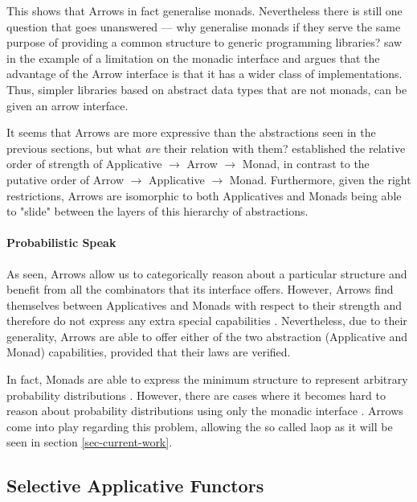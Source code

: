 \documentclass[
  oneside,
  11pt, a4paper,
  footinclude=true,
  headinclude=true,
  cleardoublepage=empty
]{scrbook}
\theoremstyle{definition}
\theoremstyle{definition}
\begin{document}
    This shows that Arrows in fact generalise monads. Nevertheless there is still one question that goes unanswered --- why generalise monads if they serve the same purpose of providing a common structure to generic programming libraries? \cite{Hughes:2000:GMA:347238.347246} saw in the example of \cite{swiestra&duponcheel} a limitation on the monadic interface and argues that the advantage of the Arrow interface is that it has a wider class of implementations. Thus, simpler libraries based on abstract data types that are not monads, can be given an arrow interface.
                
    It seems that Arrows are more expressive than the abstractions seen in the previous sections, but what \emph{are} their relation with them? \cite{Lindley:2011:IOA:1953652.1954016} established the relative order of strength of Applicative $\rightarrow$ Arrow $\rightarrow$ Monad, in contrast to the putative order of Arrow $\rightarrow$ Applicative $\rightarrow$ Monad. Furthermore, given the right restrictions, Arrows are isomorphic to both Applicatives and Monads being able to "slide" between the layers of this hierarchy of abstractions.
    	        
    	        \paragraph{Probabilistic Speak}
    	        
    As seen, Arrows allow us to categorically reason about a particular structure and benefit from all the combinators that its interface offers. However, Arrows find themselves between Applicatives and Monads with respect to their strength and therefore do not express any extra special capabilities \citep{Lindley:2011:IOA:1953652.1954016}. Nevertheless, due to their generality, Arrows are able to offer either of the two abstraction (Applicative and Monad) capabilities, provided that their laws are verified.
    	        
    In fact, Monads are able to express the minimum structure to represent arbitrary probability distributions \citep{jtobin}. However, there are cases where it becomes hard to reason about probability distributions using only the monadic interface \citep{Oliveira2016KeepDC}. Arrows come into play regarding this problem, allowing the so called \gls{laop} \citep{Macedo2012MatricesAA} as it will be seen in section \ref{sec-current-work}.
    	        
	    \subsection{Selective Applicative Functors}
	    
\end{document}
